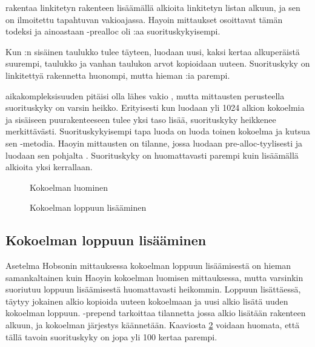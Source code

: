  rakentaa linkitetyn rakenteen lisäämällä alkioita linkitetyn listan alkuun, ja sen on ilmoitettu tapahtuvan vakioajassa. \cite{scalaCollections} Hayoin mittaukset osoittavat tämän todeksi ja ainoastaan -prealloc oli :aa suorituskykyisempi.

Kun :n sisäinen taulukko tulee täyteen, luodaan uusi, kaksi kertaa alkuperäistä suurempi, taulukko ja vanhan taulukon arvot kopioidaan uuteen. Suorituskyky on linkitettyä rakennetta huonompi, mutta hieman :ia parempi.

 aikakompleksisuuden pitäisi olla lähes vakio \cite{scalaCollections}, mutta mittausten perusteella suorituskyky on varsin heikko. Erityisesti kun luodaan yli 1024 alkion kokoelmia ja sisäiseen puurakenteeseen tulee yksi taso lisää, suorituskyky heikkenee merkittävästi. Suorituskykyisempi tapa luoda  on luoda toinen kokoelma ja kutsua sen -metodia. Haoyin mittausten  on tilanne, jossa luodaan  pre-alloc-tyylisesti ja luodaan sen pohjalta . Suorituskyky on huomattavasti parempi kuin lisäämällä alkioita yksi kerrallaan.

\begin{figure}[h]
    \centering
    
    \caption{Kokoelman luominen}\label{kokoelmanLuominen_kaavio}
\end{figure}


\begin{figure}[h]
    \centering
    
    \caption{Kokoelman loppuun lisääminen}\label{kokoelmanLoppuunLisaaminen_kaavio}
\end{figure}

\subsection{Kokoelman loppuun lisääminen}
Asetelma Hobsonin mittauksessa kokoelman loppuun lisäämisestä on hieman samankaltainen kuin Haoyin kokoelman luomisen mittauksessa, mutta varsinkin  suoriutuu loppuun lisäämisestä huomattavasti heikommin. Loppuun lisättäessä, täytyy jokainen alkio kopioida uuteen kokoelmaan ja uusi alkio lisätä uuden kokoelman loppuun. -prepend tarkoittaa tilannetta jossa alkio lisätään rakenteen alkuun, ja kokoelman järjestys käännetään. Kaaviosta \ref{kokoelmanLoppuunLisaaminen_kaavio} voidaan huomata, että tällä tavoin suorituskyky on jopa yli 100 kertaa parempi.

